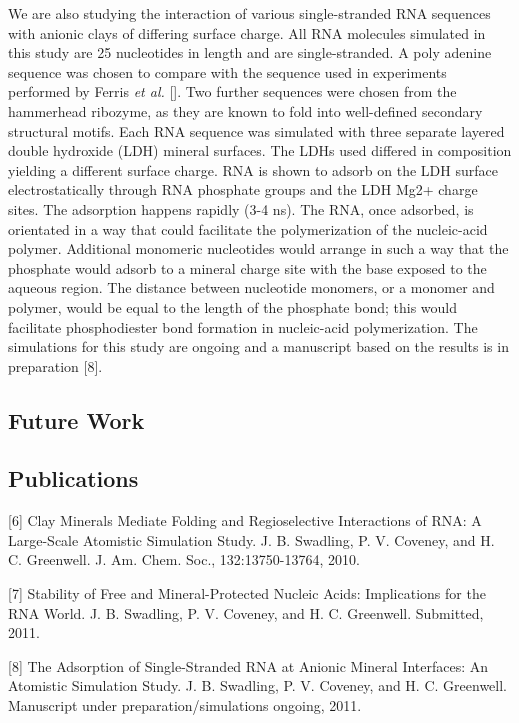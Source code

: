 \documentclass[a4paper,12pt]{article}
\begin{document}
We are also studying the interaction of various single-stranded RNA sequences with anionic clays 
of differing surface charge. All RNA molecules simulated in this study are 25 nucleotides in length and are 
single-stranded. A poly adenine sequence was chosen to compare with the sequence used in experiments 
performed by Ferris \textit{et al.} []. Two further sequences were chosen from the hammerhead ribozyme, as 
they are known  to fold into well-defined secondary structural motifs. Each RNA sequence was simulated with 
three separate layered double hydroxide (LDH) mineral surfaces. The LDHs used differed in composition yielding 
a different surface charge. RNA is shown to adsorb on the LDH surface electrostatically through RNA phosphate 
groups and the LDH Mg2+ charge sites. The adsorption happens rapidly (3-4 ns). The RNA, once adsorbed, is orientated in 
a way that could facilitate the polymerization of the nucleic-acid polymer. Additional monomeric nucleotides 
would arrange in such a way that the phosphate would adsorb to a mineral charge site with the base exposed to 
the aqueous region. The distance between nucleotide monomers, or a monomer and polymer, would be equal to the 
length of the phosphate bond; this would facilitate phosphodiester bond formation in nucleic-acid polymerization.
The simulations for this study are ongoing and a manuscript based on the results is in preparation [8].

\subsection{Future Work}

\subsection{Publications}

[6] Clay Minerals Mediate Folding and Regioselective Interactions of RNA: A Large-Scale Atomistic Simulation Study. J. B. Swadling, P. V. Coveney, and H. C. Greenwell. J. Am. Chem. Soc., 132:13750-13764, 2010.

[7] Stability of Free and Mineral-Protected Nucleic Acids: Implications for the RNA World. J. B. Swadling, P. V. Coveney, and H. C. Greenwell. Submitted, 2011.

[8] The Adsorption of Single-Stranded RNA at Anionic Mineral Interfaces: An Atomistic Simulation Study. J. B. Swadling, P. V. Coveney, and H. C. Greenwell. Manuscript under preparation/simulations ongoing, 2011.
\end{document}
